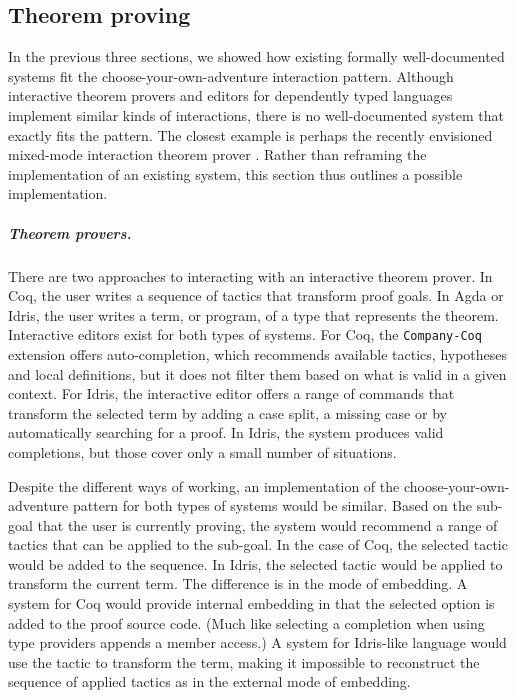 \documentclass[a4paper,UKenglish,cleveref, autoref, thm-restate]{lipics-v2021}
\begin{document}
\newpage

\subsection{Theorem proving}
\label{sec:examples-thm}

In the previous three sections, we showed how existing formally well-documented systems fit the
choose-your-own-adventure interaction pattern. Although interactive theorem provers and editors
for dependently typed languages implement similar kinds of interactions, there is no well-documented
system that exactly fits the pattern. The closest example is perhaps the recently envisioned
mixed-mode interaction theorem prover \cite{verter-2024-mixed}. Rather than reframing the
implementation of an existing system, this section thus outlines a possible implementation.

\subparagraph{Theorem provers.}
There are two approaches to interacting with an interactive theorem prover. In Coq, the user
writes a sequence of tactics that transform proof goals. In Agda or Idris, the user writes a
term, or program, of a type that represents the theorem. Interactive editors exist for both
types of systems. For Coq, the \texttt{Company-Coq} \cite{pitclaudel-2016-companycoq,aspinall-2000-general}
extension offers auto-completion, which recommends available tactics, hypotheses and local
definitions, but it does not filter them based on what is valid in a given context.
For Idris, the interactive editor \cite{brady-2015-idris} offers a range of commands that
transform the selected term by adding a case split, a missing case or by automatically searching
for a proof. In Idris, the system produces valid completions, but those cover only a small number
of situations.

Despite the different ways of working, an implementation of the choose-your-own-adventure
pattern for both types of systems would be similar. Based on the sub-goal that the user is
currently proving, the system would recommend a range of tactics that can be applied to the
sub-goal. In the case of Coq, the selected tactic would be added to the sequence. In Idris, the
selected tactic would be applied to transform the current term. The difference is in the mode of
embedding. A system for Coq would provide internal embedding in that the selected option is added
to the proof source code. (Much like selecting a completion when using type providers appends a
member access.) A system for Idris-like language would use the tactic to transform the term,
making it impossible to reconstruct the sequence of applied tactics as in the external mode of
embedding.
\end{document}
